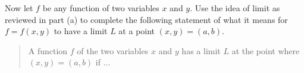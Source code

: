 \begin{pa}
\begin{enumerate}[i.]
\begin{comment}

If we hold $x$ constant at $x=0$, then $f(0,y)$ is a function of $y$
alone. More specifically, 
\[f(0,y) = \frac{y^2}{y}.\]
Since we don't let $y$ actually equal 0 in the limit, we have
\[\lim_{y \to 0} f(0,y) = \lim_{y \to 0} \frac{y^2}{y} = \lim_{y \to 0} y = 0.\]

\end{comment}

        \end{enumerate}

    \item Now let $f$ be any function of two variables $x$ and
      $y$. Use the idea of limit as reviewed in part (a) to complete
      the following statement of what it means for $f = f(x,y)$ to
      have a limit $L$ at a point $(x, y) = (a, b)$. 

\begin{quote} A function $f$ of the two variables $x$ and $y$ has a
  limit $L$ at the point where $(x, y) = (a, b)$ if $\ldots$ 
\end{quote}

\begin{comment}

A function $f = f(x,y)$ of the independent variables $x$ and $y$ has a
limit $L$ at the point where $(x,y) = (a,b)$ if we can make all of the
values of $f(x,y)$ as close as we want to $L$ by choosing $(x,y)$ as
close to $(a,b)$ (but not equal to $(a,b)$) as we need. 

\end{comment}

    \ea


\end{pa} \afterpa 